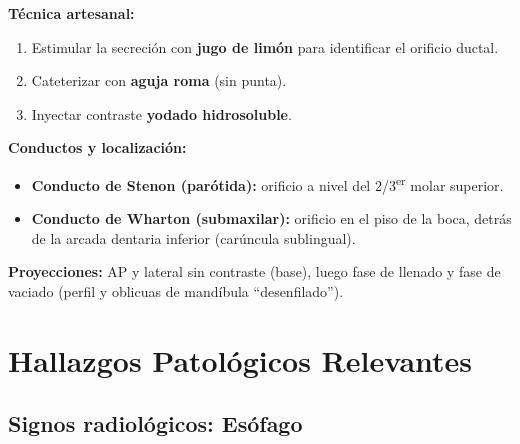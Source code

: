 \textbf{Técnica artesanal:}
\begin{enumerate}[noitemsep]
	\item Estimular la secreción con \textbf{jugo de limón} para identificar el orificio ductal.
	\item Cateterizar con \textbf{aguja roma} (sin punta).
	\item Inyectar contraste \textbf{yodado hidrosoluble}.
\end{enumerate}

\textbf{Conductos y localización:}
\begin{itemize}[noitemsep]
	\item \textbf{Conducto de Stenon (parótida):} orificio a nivel del 2\textordfeminine/3\textsuperscript{er} molar superior.
	\item \textbf{Conducto de Wharton (submaxilar):} orificio en el piso de la boca, detrás de la arcada dentaria inferior (carúncula sublingual).
\end{itemize}

\textbf{Proyecciones:} AP y lateral sin contraste (base), luego fase de llenado y fase de vaciado (perfil y oblicuas de mandíbula ``desenfilado'').

\section*{Hallazgos Patológicos Relevantes}

\subsection*{Signos radiológicos: Esófago}


